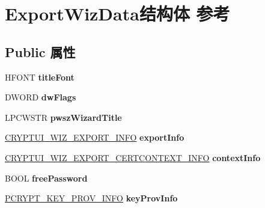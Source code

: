 \hypertarget{struct_export_wiz_data}{}\section{Export\+Wiz\+Data结构体 参考}
\label{struct_export_wiz_data}
\subsection*{Public 属性}
\begin{DoxyCompactItemize}
\item 
\mbox{\label{struct_export_wiz_data_a7a41fb20b264564e1c281050ad2ed7fd}} 
H\+F\+O\+NT {\bfseries title\+Font}
\item 
\mbox{\label{struct_export_wiz_data_a10a2b3228445092d74e85317a7427ccf}} 
D\+W\+O\+RD {\bfseries dw\+Flags}
\item 
\mbox{\label{struct_export_wiz_data_a70f60a52c1fb9fcef3a99c4ba695ba85}} 
L\+P\+C\+W\+S\+TR {\bfseries pwsz\+Wizard\+Title}
\item 
\mbox{\label{struct_export_wiz_data_aadcaeafcd14de3ac2d276e4792f0060c}} 
\hyperlink{struct___c_r_y_p_t_u_i___w_i_z___e_x_p_o_r_t___i_n_f_o}{C\+R\+Y\+P\+T\+U\+I\+\_\+\+W\+I\+Z\+\_\+\+E\+X\+P\+O\+R\+T\+\_\+\+I\+N\+FO} {\bfseries export\+Info}
\item 
\mbox{\label{struct_export_wiz_data_a4f5acb3c043fd9a8f176646a6056d3ad}} 
\hyperlink{struct___c_r_y_p_t_u_i___w_i_z___e_x_p_o_r_t___c_e_r_t_c_o_n_t_e_x_t___i_n_f_o}{C\+R\+Y\+P\+T\+U\+I\+\_\+\+W\+I\+Z\+\_\+\+E\+X\+P\+O\+R\+T\+\_\+\+C\+E\+R\+T\+C\+O\+N\+T\+E\+X\+T\+\_\+\+I\+N\+FO} {\bfseries context\+Info}
\item 
\mbox{\label{struct_export_wiz_data_ac6b941a9ee5d4ce4193b80e4d72a30d8}} 
B\+O\+OL {\bfseries free\+Password}
\item 
\mbox{\label{struct_export_wiz_data_a7bce511d289c5e92dbc761e01e424e9d}} 
\hyperlink{struct___c_r_y_p_t___k_e_y___p_r_o_v___i_n_f_o}{P\+C\+R\+Y\+P\+T\+\_\+\+K\+E\+Y\+\_\+\+P\+R\+O\+V\+\_\+\+I\+N\+FO} {\bfseries key\+Prov\+Info}

\end{DoxyCompactItemize}
